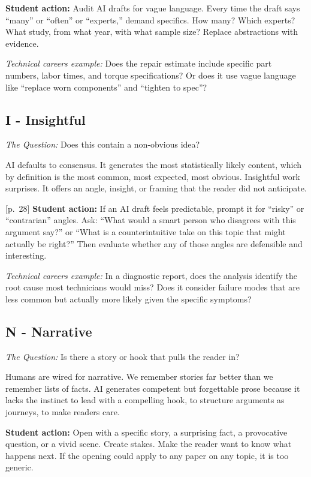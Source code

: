 \documentclass[
  letterpaper,
  DIV=11,
  numbers=noendperiod]{scrreprt}
\begin{document}
\textbf{Student action:} Audit AI drafts for vague language. Every time
the draft says ``many'' or ``often'' or ``experts,'' demand specifics.
How many? Which experts? What study, from what year, with what sample
size? Replace abstractions with evidence.

\emph{Technical careers example:} Does the repair estimate include
specific part numbers, labor times, and torque specifications? Or does
it use vague language like ``replace worn components'' and ``tighten to
spec''?

\subsection{I - Insightful}\label{i---insightful}

\emph{The Question:} Does this contain a non-obvious idea?

AI defaults to consensus. It generates the most statistically likely
content, which by definition is the most common, most expected, most
obvious. Insightful work surprises. It offers an angle, insight, or
framing that the reader did not anticipate.

{[}p.~28{]} \textbf{Student action:} If an AI draft feels predictable,
prompt it for ``risky'' or ``contrarian'' angles. Ask: ``What would a
smart person who disagrees with this argument say?'' or ``What is a
counterintuitive take on this topic that might actually be right?'' Then
evaluate whether any of those angles are defensible and interesting.

\emph{Technical careers example:} In a diagnostic report, does the
analysis identify the root cause most technicians would miss? Does it
consider failure modes that are less common but actually more likely
given the specific symptoms?

\subsection{N - Narrative}\label{n---narrative}

\emph{The Question:} Is there a story or hook that pulls the reader in?

Humans are wired for narrative. We remember stories far better than we
remember lists of facts. AI generates competent but forgettable prose
because it lacks the instinct to lead with a compelling hook, to
structure arguments as journeys, to make readers care.

\textbf{Student action:} Open with a specific story, a surprising fact,
a provocative question, or a vivid scene. Create stakes. Make the reader
want to know what happens next. If the opening could apply to any paper
on any topic, it is too generic.
\end{document}
